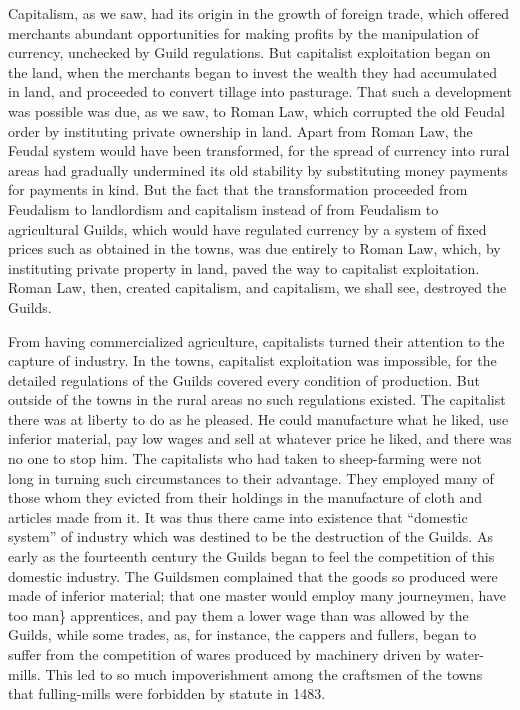 \documentclass{book}
\begin{document}
Capitalism, as we saw, had its origin in the growth of foreign trade, which offered merchants abundant opportunities for making profits by the manipulation of currency, unchecked by Guild regulations. But capitalist exploitation began on the land, when the merchants began to invest the wealth they had accumulated in land, and proceeded to convert tillage into pasturage. That such a development was possible was due, as we saw, to Roman Law, which corrupted the old Feudal order by instituting private ownership in land. Apart from Roman Law, the Feudal system would have been transformed, for the spread of currency into rural areas had gradually undermined its old stability by substituting money payments for payments in kind. But the fact that the transformation proceeded from Feudalism to landlordism and capitalism instead of from Feudalism to agricultural Guilds, which would have regulated currency by a system of fixed prices such as obtained in the towns, was due entirely to Roman Law, which, by instituting private property in land, paved the way to capitalist exploitation. Roman Law, then, created capitalism, and capitalism, we shall see, destroyed the Guilds.

From having commercialized agriculture, capitalists turned their attention to the capture of industry. In the towns, capitalist exploitation was impossible, for the detailed regulations of the Guilds covered every condition of production. But outside of the towns in the rural areas no such regulations existed. The capitalist there was at liberty to do as he pleased. He could manufacture what he liked, use inferior material, pay low wages and sell at whatever price he liked, and there was no one to stop him. The capitalists who had taken to sheep-farming were not long in turning such circumstances to their advantage. They employed many of those whom they evicted from their holdings in the manufacture of cloth and articles made from it. It was thus there came into existence that “domestic system” of industry which was destined to be the destruction of the Guilds. As early as the fourteenth century the Guilds began to feel the competition of this domestic industry. The Guildsmen complained that the goods so produced were made of inferior material; that one master would employ many journeymen, have too man\} apprentices, and pay them a lower wage than was allowed by the Guilds, while some trades, as, for instance, the cappers and fullers, began to suffer from the competition of wares produced by machinery driven by water-mills. This led to so much impoverishment among the craftsmen of the towns that fulling-mills were forbidden by statute in 1483.
\end{document}
